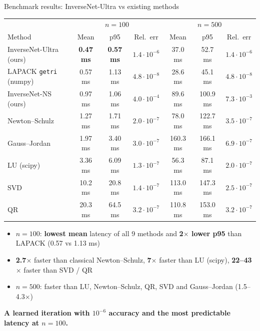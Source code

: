 \documentclass[aspectratio=169,11pt,xcolor=table]{beamer}
\newcommand{\gd}[1]{\textcolor{good}{\textbf{#1}}}
\newcommand{\best}[1]{\textbf{\textcolor{good}{#1}}}
\newcommand{\ours}{\rowcolor{good!15}}
\newcommand{\takeaway}[1]{%
  \vfill
  \begin{alertblock}{}\centering\textbf{#1}\end{alertblock}}
\begin{document}
\begin{frame}{Benchmark results: InverseNet-Ultra vs existing methods}
  \centering
  \footnotesize\setlength{\tabcolsep}{4pt}
  \begin{tabular}{lccc|ccc}
    \toprule
    & \multicolumn{3}{c|}{$n = 100$} & \multicolumn{3}{c}{$n = 500$} \\
    Method & Mean & p95 & Rel.\ err & Mean & p95 & Rel.\ err \\
    \midrule
    \ours InverseNet-Ultra (ours) & \best{0.47 ms} & \best{0.57 ms} & $1.4\cdot10^{-6}$ & 37.0 ms & 52.7 ms & $1.4\cdot10^{-6}$ \\
    LAPACK \texttt{getri} (numpy) & 0.57 ms & 1.13 ms & $4.8\cdot10^{-8}$ & 28.6 ms & 45.1 ms & $4.8\cdot10^{-8}$ \\
    InverseNet-NS (ours) & 0.97 ms & 1.06 ms & $4.0\cdot10^{-4}$ & 89.6 ms & 100.9 ms & $7.3\cdot10^{-3}$ \\
    Newton--Schulz & 1.27 ms & 1.71 ms & $2.0\cdot10^{-7}$ & 78.0 ms & 122.7 ms & $3.5\cdot10^{-7}$ \\
    Gauss--Jordan & 1.97 ms & 3.40 ms & $3.0\cdot10^{-7}$ & 160.3 ms & 166.1 ms & $6.9\cdot10^{-7}$ \\
    LU (scipy) & 3.36 ms & 6.09 ms & $1.3\cdot10^{-7}$ & 56.3 ms & 87.1 ms & $2.0\cdot10^{-7}$ \\
    SVD & 10.2 ms & 20.8 ms & $1.4\cdot10^{-7}$ & 113.0 ms & 147.3 ms & $2.5\cdot10^{-7}$ \\
    QR & 20.3 ms & 64.5 ms & $3.2\cdot10^{-7}$ & 110.8 ms & 153.0 ms & $3.2\cdot10^{-7}$ \\
    \bottomrule
  \end{tabular}
  \vspace{2mm}
  \begin{itemize}\footnotesize
    \item $n=100$: \gd{lowest mean} latency of all 9 methods and \gd{2$\times$ lower p95} than LAPACK (0.57 vs 1.13 ms)
    \item \gd{2.7$\times$} faster than classical Newton--Schulz, \gd{7$\times$} faster than LU (scipy), \gd{22--43$\times$} faster than SVD / QR
    \item $n=500$: faster than LU, Newton--Schulz, QR, SVD and Gauss--Jordan (1.5--4.3$\times$)
  \end{itemize}
  \takeaway{A learned iteration with $10^{-6}$ accuracy and the most predictable latency at $n = 100$.}
\end{frame}
\end{document}
